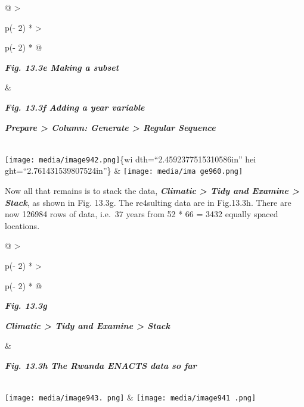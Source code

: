 \documentclass[
  letterpaper,
  DIV=11,
  numbers=noendperiod]{scrreprt}
\begin{document}
\begin{longtable}[]{@{}
  >{\raggedright\arraybackslash}p{(\columnwidth - 2\tabcolsep) * }
  >{\raggedright\arraybackslash}p{(\columnwidth - 2\tabcolsep) * }@{}}
\toprule\noalign{}
\begin{minipage}[b]{\linewidth}\raggedright
\textbf{\emph{Fig. 13.3e Making a subset}}
\end{minipage} & \begin{minipage}[b]{\linewidth}\raggedright
\textbf{\emph{Fig. 13.3f Adding a year variable}}

\textbf{\emph{Prepare \textgreater{} Column: Generate \textgreater{}
Regular Sequence}}
\end{minipage} \\
\midrule\noalign{}
\endhead
\bottomrule\noalign{}
\endlastfoot
\texttt{[image: media/image942.png]}\{wi dth=``2.4592377515310586in''
hei ght=``2.761431539807524in''\} &
\texttt{[image: media/ima ge960.png]} \\
\end{longtable}

Now all that remains is to stack the data, \textbf{\emph{Climatic
\textgreater{} Tidy and Examine \textgreater{} Stack}}, as shown in Fig.
13.3g. The re4sulting data are in Fig.13.3h. There are now 126984 rows
of data, i.e.~37 years from 52 * 66 = 3432 equally spaced locations.

\begin{longtable}[]{@{}
  >{\raggedright\arraybackslash}p{(\columnwidth - 2\tabcolsep) * }
  >{\raggedright\arraybackslash}p{(\columnwidth - 2\tabcolsep) * }@{}}
\toprule\noalign{}
\begin{minipage}[b]{\linewidth}\raggedright
\textbf{\emph{Fig. 13.3g}}

\textbf{\emph{Climatic \textgreater{} Tidy and Examine \textgreater{}
Stack}}
\end{minipage} & \begin{minipage}[b]{\linewidth}\raggedright
\textbf{\emph{Fig. 13.3h The Rwanda ENACTS data so far}}
\end{minipage} \\
\midrule\noalign{}
\endhead
\bottomrule\noalign{}
\endlastfoot
\texttt{[image: media/image943. png]}
&
\texttt{[image: media/image941 .png]} \\
\end{longtable}
\end{document}
